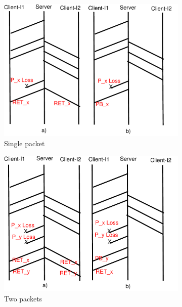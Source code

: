 \documentclass[10pt,conference]{IEEEtran}
\begin{document}
\renewcommand{\thesubfigure}{\roman{subfigure}}
\begin{figure}[!tbp]
 \begin{subfigure}[b]{0.32\textwidth}
	\includegraphics[angle=0, width=\textwidth, natwidth=610, natheight=400]{images/timing1P.pdf}
	\caption{Single packet}\label{timing1P}
 \end{subfigure}
 \hfill
 \begin{subfigure}[b]{0.32\textwidth} 
	\includegraphics[angle=0, width=\textwidth, natwidth=610, natheight=400]{images/timing2P.pdf}
	\caption{Two packets }\label{timing2P}
 \end{subfigure} 
 \hfill
 \begin{subfigure}[b]{0.32\textwidth}

\end{subfigure}
\end{figure}
\end{document}
